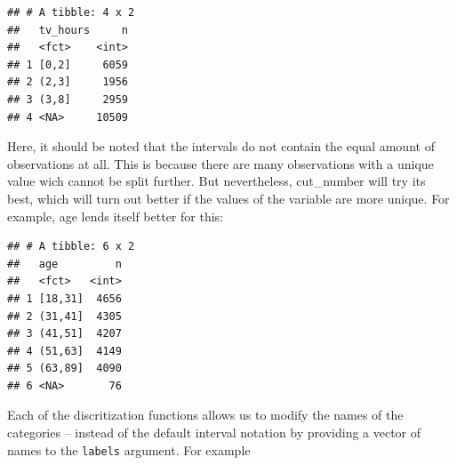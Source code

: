 \documentclass[]{tufte-book}
\newenvironment{Shaded}{}{}
\newcommand{\KeywordTok}[1]{\textcolor[rgb]{0.00,0.44,0.13}{\textbf{#1}}}
\newcommand{\DataTypeTok}[1]{\textcolor[rgb]{0.56,0.13,0.00}{#1}}
\newcommand{\DecValTok}[1]{\textcolor[rgb]{0.25,0.63,0.44}{#1}}
\newcommand{\StringTok}[1]{\textcolor[rgb]{0.25,0.44,0.63}{#1}}
\newcommand{\OperatorTok}[1]{\textcolor[rgb]{0.40,0.40,0.40}{#1}}
\newcommand{\NormalTok}[1]{#1}
\begin{document}
\begin{verbatim}
## # A tibble: 4 x 2
##   tv_hours     n
##   <fct>    <int>
## 1 [0,2]     6059
## 2 (2,3]     1956
## 3 (3,8]     2959
## 4 <NA>     10509
\end{verbatim}

Here, it should be noted that the intervals do not contain the equal
amount of observations at all. This is because there are many
observations with a unique value wich cannot be split further. But
nevertheless, cut\_number will try its best, which will turn out better
if the values of the variable are more unique. For example, age lends
itself better for this:

\begin{Shaded}
\end{Shaded}

\begin{verbatim}
## # A tibble: 6 x 2
##   age         n
##   <fct>   <int>
## 1 [18,31]  4656
## 2 (31,41]  4305
## 3 (41,51]  4207
## 4 (51,63]  4149
## 5 (63,89]  4090
## 6 <NA>       76
\end{verbatim}

Each of the discritization functions allows us to modify the names of
the categories -- instead of the default interval notation by providing
a vector of names to the \texttt{labels} argument. For example

\begin{Shaded}
\end{Shaded}
\end{document}
